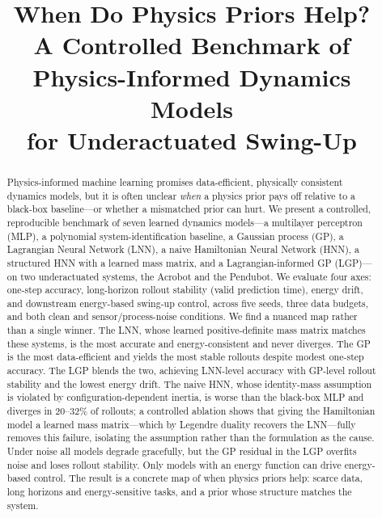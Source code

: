 \documentclass[conference]{IEEEtran}
\begin{document}
\title{When Do Physics Priors Help?\\
A Controlled Benchmark of Physics-Informed Dynamics Models\\
for Underactuated Swing-Up}

\author{
}

\maketitle

\begin{abstract}
Physics-informed machine learning promises data-efficient, physically
consistent dynamics models, but it is often unclear \emph{when} a physics prior
pays off relative to a black-box baseline---or whether a mismatched prior can
hurt. We present a controlled, reproducible benchmark of seven learned dynamics
models---a multilayer perceptron (MLP), a polynomial system-identification
baseline, a Gaussian process (GP), a Lagrangian Neural Network (LNN), a naive
Hamiltonian Neural Network (HNN), a structured HNN with a learned mass matrix,
and a Lagrangian-informed GP (LGP)---on two underactuated systems, the Acrobot
and the Pendubot. We evaluate four axes: one-step accuracy, long-horizon rollout
stability (valid prediction time), energy drift, and downstream energy-based
swing-up control, across five seeds, three data budgets, and both clean and
sensor/process-noise conditions. We find a nuanced map rather than a single
winner. The LNN, whose learned positive-definite mass matrix matches these
systems, is the most accurate and energy-consistent and never diverges. The GP
is the most data-efficient and yields the most stable rollouts despite modest
one-step accuracy. The LGP blends the two, achieving LNN-level accuracy with
GP-level rollout stability and the lowest energy drift. The naive HNN, whose
identity-mass assumption is violated by configuration-dependent inertia, is
worse than the black-box MLP and diverges in $20$--$32\%$ of rollouts; a
controlled ablation shows that giving the Hamiltonian model a learned mass
matrix---which by Legendre duality recovers the LNN---fully removes this failure,
isolating the assumption rather than the formulation as the cause. Under noise
all models degrade gracefully, but the GP residual in the LGP overfits noise and
loses rollout stability. Only models with an energy function can drive
energy-based control. The result is a concrete map of when physics priors help:
scarce data, long horizons and energy-sensitive tasks, and a prior whose
structure matches the system.
\end{abstract}
\end{document}
